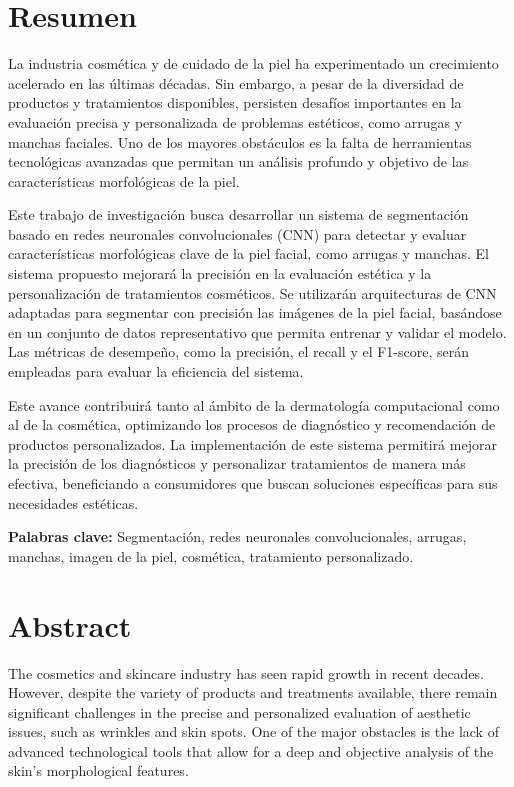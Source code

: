 \thispagestyle{plain}

\chapter*{Resumen}

La industria cosmética y de cuidado de la piel ha experimentado un crecimiento acelerado en las últimas décadas. Sin embargo, a pesar de la diversidad de productos y tratamientos disponibles, persisten desafíos importantes en la evaluación precisa y personalizada de problemas estéticos, como arrugas y manchas faciales. Uno de los mayores obstáculos es la falta de herramientas tecnológicas avanzadas que permitan un análisis profundo y objetivo de las características morfológicas de la piel.

Este trabajo de investigación busca desarrollar un sistema de segmentación basado en redes neuronales convolucionales (CNN) para detectar y evaluar características morfológicas clave de la piel facial, como arrugas y manchas. El sistema propuesto mejorará la precisión en la evaluación estética y la personalización de tratamientos cosméticos. Se utilizarán arquitecturas de CNN adaptadas para segmentar con precisión las imágenes de la piel facial, basándose en un conjunto de datos representativo que permita entrenar y validar el modelo. Las métricas de desempeño, como la precisión, el recall y el F1-score, serán empleadas para evaluar la eficiencia del sistema.

Este avance contribuirá tanto al ámbito de la dermatología computacional como al de la cosmética, optimizando los procesos de diagnóstico y recomendación de productos personalizados. La implementación de este sistema permitirá mejorar la precisión de los diagnósticos y personalizar tratamientos de manera más efectiva, beneficiando a consumidores que buscan soluciones específicas para sus necesidades estéticas.

\textbf{Palabras clave:} Segmentación, redes neuronales convolucionales, arrugas, manchas, imagen de la piel, cosmética, tratamiento personalizado.

\clearpage
\chapter*{Abstract}

The cosmetics and skincare industry has seen rapid growth in recent decades. However, despite the variety of products and treatments available, there remain significant challenges in the precise and personalized evaluation of aesthetic issues, such as wrinkles and skin spots. One of the major obstacles is the lack of advanced technological tools that allow for a deep and objective analysis of the skin's morphological features.

